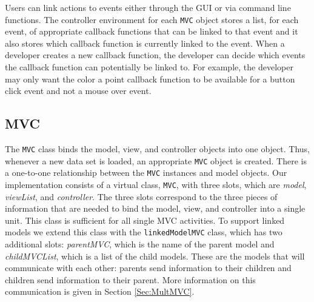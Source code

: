 \documentclass[11pt]{article}
\newcommand{\Robject}[1]{{\texttt{#1}}}
\newcommand{\Rslot}[1]{\textsl{#1}}
\newcommand{\Rclass}[1]{\texttt{#1}}
\begin{document}
Users can link actions to events either through the GUI or via
command line functions.  The controller environment for each \Robject{MVC}
object stores a list, for each event, of appropriate callback functions that
can be linked to that event and it also stores which callback function is
currently linked to the event.  When a developer creates a new callback
function, the developer can decide which events the callback function can
potentially be linked to.  For example, the developer may only want the color
a point callback function to be available for a button click event and not a
mouse over event.

\subsection{MVC}
\label{Ssec:OneMVC}
 
The \Rclass{MVC} class binds the model, view, and controller objects
into one object.  Thus, whenever a new data set is loaded, an
appropriate \Robject{MVC} object is created.  There is a one-to-one
relationship between the \Robject{MVC} instances and model objects.
Our implementation consists
of a virtual class, \Rclass{MVC}, with three slots, which are
\Rslot{model}, \Rslot{viewList}, and \Rslot{controller}. The three
slots correspond to the three pieces of information that are needed to
bind the model, view, and controller into a single unit. This class is
sufficient for all single MVC activities. To support linked models
we extend this class with the \Rclass{linkedModelMVC} class, which has
two additional slots: \Rslot{parentMVC}, which is the name of the
parent model and \Rslot{childMVCList}, which is a list of the child models.
These are the models that will communicate with each other: parents send
information to their children and children send information to their parent.
More information on this communication is given in Section \ref{Sec:MultMVC}.
\end{document}

